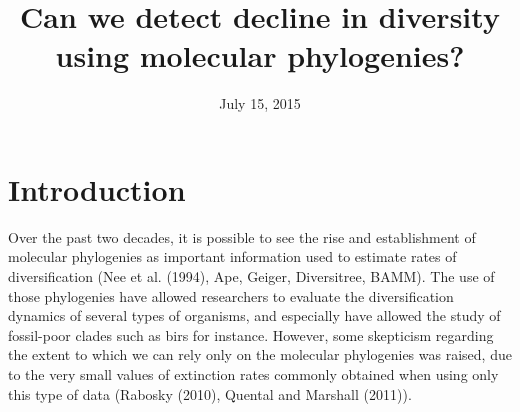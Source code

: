 \documentclass[12pt,]{article}
\title{Can we detect decline in diversity using molecular phylogenies?}
\author{}
\date{July 15, 2015}
\begin{document}
\maketitle

\section{Introduction}\label{introduction}

Over the past two decades, it is possible to see the rise and
establishment of molecular phylogenies as important information used to
estimate rates of diversification (Nee et al. (1994), Ape, Geiger,
Diversitree, BAMM). The use of those phylogenies have allowed
researchers to evaluate the diversification dynamics of several types of
organisms, and especially have allowed the study of fossil-poor clades
such as birs for instance. However, some skepticism regarding the extent
to which we can rely only on the molecular phylogenies was raised, due
to the very small values of extinction rates commonly obtained when
using only this type of data (Rabosky (2010), Quental and Marshall
(2011)).
\end{document}
